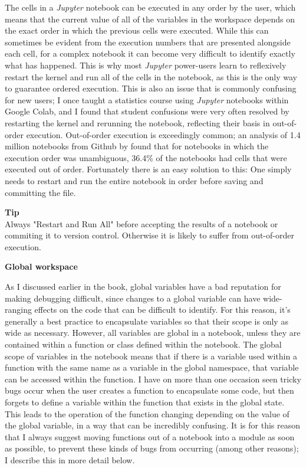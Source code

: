 The cells in a \textit{Jupyter} notebook can be executed in any order by the user, which means that the current value of all of the variables in the workspace depends on the exact order in which the previous cells were executed.  While this can sometimes be evident from the execution numbers that are presented alongside each cell, for a complex notebook it can become very difficult to identify exactly what has happened. This is why most \textit{Jupyter} power-users learn to reflexively restart the kernel and run all of the cells in the notebook, as this is the only way to guarantee ordered execution. This is also an issue that is commonly confusing for new users; I once taught a statistics course using \textit{Jupyter} notebooks within Google Colab, and I found that student confusions were very often resolved by restarting the kernel and rerunning the notebook, reflecting their basis in out-of-order execution.  Out-of-order execution is exceedingly common; an analysis of 1.4 million notebooks from Github by \cite{Pimentel:2019aa} found that for notebooks in which the execution order was unambiguous, 36.4\% of the notebooks had cells that were executed out of order.  Fortunately there is an easy solution to this: One simply needs to restart and run the entire notebook in order before saving and committing the file.

\begin{framed}
\textbf{Tip}\\
Always "Restart and Run All" before accepting the results of a notebook or commiting it to version control.  Otherwise it is likely to suffer from out-of-order execution.
\end{framed}

\textbf{Global workspace}

As I discussed earlier in the book, global variables have a bad reputation for making debugging difficult, since changes to a global variable can have wide-ranging effects on the code that can be difficult to identify.  For this reason, it's generally a best practice to encapsulate variables so that their scope is only as wide as necessary.  However, all variables are global in a notebook, unless they are contained within a function or class defined within the notebook.  The global scope of variables in the notebook means that if there is a variable used within a function with the same name as a variable in the global namespace, that variable can be accessed within the function.  I have on more than one occasion seen tricky bugs occur when the user creates a function to encapsulate some code, but then forgets to define a variable within the function that exists in the global state.  This leads to the operation of the function changing depending on the value of the global variable, in a way that can be incredibly confusing.  It is for this reason that I always suggest moving functions out of a notebook into a module as soon as possible, to prevent these kinds of bugs from occurring (among other reasons); I describe this in more detail below.

